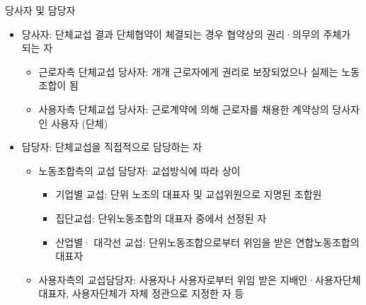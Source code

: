 \documentclass[aspectratio=169,xcolor=dvipsnames,handout]{beamer}
\begin{document}
\begin{frame}[allowframebreaks]{당사자 및 담당자}
    \begin{itemize}[<+->]
        \item 당사자: 단체교섭 결과 단체협약이 체결되는 경우 협약상의 권리·의무의 주체가 되는 자
        \begin{itemize}[<+->]
            \item 근로자측 단체교섭 당사자: 개개 근로자에게 권리로 보장되었으나 실제는 노동조합이 됨
            \item 사용자측 단체교섭 당사자: 근로계약에 의해 근로자를 채용한 계약상의 당사자인 사용자 (단체)
        \end{itemize}
    \framebreak\relax
    \item 담당자: 단체교섭을 직접적으로 담당하는 자
        \begin{itemize}[<+->]
            \item 노동조합측의 교섭 담당자: 교섭방식에 따라 상이
        \begin{itemize}[<+->]
            \item 기업별 교섭: 단위 노조의 대표자 및 교섭위원으로 지명된 조합원 
            \item 집단교섭: 단위노동조합의 대표자 중에서 선정된 자
            \item 산업별· 대각선 교섭: 단위노동조합으로부터 위임을 받은 연합노동조합의 대표자
        \end{itemize}
    \item 사용자측의 교섭담당자: 사용자나 사용자로부터 위임 받은 지배인·사용자단체 대표자, 사용자단체가 자체 정관으로 지정한 자 등
        \end{itemize}
    \end{itemize}
\end{frame}
\end{document}
